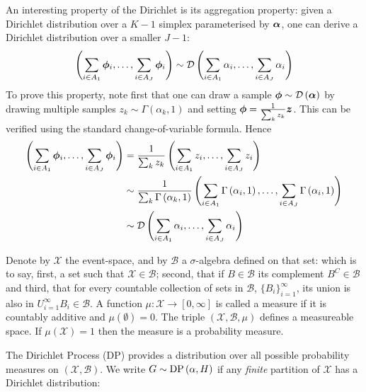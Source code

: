 An interesting property of the Dirichlet is its aggregation property: given a Dirichlet distribution over a $K-1$ simplex parameterised by $\bm \alpha$, one can derive a Dirichlet distribution over a smaller $J-1$:
\begin{equation}
\left(
    \sum_{i \in A_1} { \bm \phi }_i, \ldots, \sum_{i \in A_J} { \bm \phi }_i
\right)
\sim
\mathcal{D} \left( {
    \sum_{i \in A_1} \alpha_i, \ldots, \sum_{i \in A_J} \alpha_i
} \right)
\end{equation}
To prove this property, note first that one can draw a sample ${ \bm \phi } \sim \mathcal{D} \left( {\bm \alpha} \right)$ by drawing multiple samples $z_k \sim \Gamma(\alpha_k, 1)$ and setting ${ \bm \phi } = \frac{1}{ {\sum_k z_k} } \bm z$. This can be verified using the standard change-of-variable formula. Hence
\begin{align}
\begin{split}
\left(
    \sum_{i \in A_1} { \bm \phi }_i, \ldots, \sum_{i \in A_J} { \bm \phi }_i 
\right)
& = 
\frac{1}{ {\sum_k z_k} }
\left(
    \sum_{i \in A_1} z_i, \ldots, \sum_{i \in A_J} z_i
\right) \\& \sim
\frac{1}{ {\sum_k \Gamma \left( {\alpha_k}, {1} \right)} }
\left(
    \sum_{i \in A_1} \Gamma \left( {\alpha_i}, {1} \right), \ldots, \sum_{i \in A_J} \Gamma \left( {\alpha_i}, {1} \right)
\right) \\
& \sim
\mathcal{D} \left( {
    \sum_{i \in A_1} \alpha_i, \ldots, \sum_{i \in A_J} \alpha_i
} \right)
\end{split}
\end{align}


\newcommand \eventspace { \mathcal{X}  }
\newcommand \sigalgebra { \mathcal{B}  }

Denote by $\eventspace$ the event-space, and by $\sigalgebra$ a $\sigma$-algebra defined on that set: which is to say, first, a set such that $\eventspace \in \sigalgebra$; second, that if $B \in \sigalgebra$ its complement $B^{C} \in \sigalgebra$ and third, that for every countable collection of sets in $\sigalgebra$, $\{ B_i \}_{i=1}^{\infty}$, its union is also in $U_{i=1}^{\infty} B_i \in \sigalgebra$. A function $\mu : \eventspace \rightarrow [0, \infty]$ is called a measure if it is countably additive and $\mu( \emptyset ) = 0$. The triple $(\eventspace, \sigalgebra, \mu)$ defines a measureable space. If $\mu(\eventspace) = 1$ then the measure is a probability measure.

The Dirichlet Process (DP) provides a distribution over all possible probability measures on $(\eventspace, \sigalgebra)$. We write $G \sim \text{DP} \left( {\alpha, H} \right)$ if any \emph{finite} partition of $\eventspace$ has a Dirichlet distribution:


